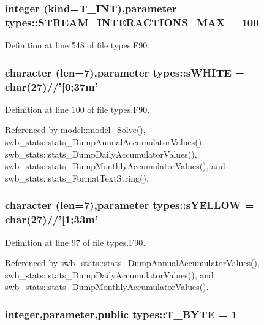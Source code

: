 \hypertarget{namespacetypes_a4ff333366786c6aa260d0b177b01c29a}{
\subsubsection[{STREAM\_\-INTERACTIONS\_\-MAX}]{\setlength{\rightskip}{0pt plus 5cm}integer (kind={\bf T\_\-INT}),parameter {\bf types::STREAM\_\-INTERACTIONS\_\-MAX} = 100}}
\label{namespacetypes_a4ff333366786c6aa260d0b177b01c29a}


Definition at line 548 of file types.F90.

\hypertarget{namespacetypes_a71a8a20288478902850fec078b982946}{
\subsubsection[{sWHITE}]{\setlength{\rightskip}{0pt plus 5cm}character (len=7),parameter {\bf types::sWHITE} = char(27)//'\mbox{[}0;37m'}}
\label{namespacetypes_a71a8a20288478902850fec078b982946}


Definition at line 100 of file types.F90.



Referenced by model::model\_\-Solve(), swb\_\-stats::stats\_\-DumpAnnualAccumulatorValues(), swb\_\-stats::stats\_\-DumpDailyAccumulatorValues(), swb\_\-stats::stats\_\-DumpMonthlyAccumulatorValues(), and swb\_\-stats::stats\_\-FormatTextString().

\hypertarget{namespacetypes_aea7cf70fa292d9310d8684a10a075b10}{
\subsubsection[{sYELLOW}]{\setlength{\rightskip}{0pt plus 5cm}character (len=7),parameter {\bf types::sYELLOW} = char(27)//'\mbox{[}1;33m'}}
\label{namespacetypes_aea7cf70fa292d9310d8684a10a075b10}


Definition at line 97 of file types.F90.



Referenced by swb\_\-stats::stats\_\-DumpAnnualAccumulatorValues(), swb\_\-stats::stats\_\-DumpDailyAccumulatorValues(), and swb\_\-stats::stats\_\-DumpMonthlyAccumulatorValues().

\hypertarget{namespacetypes_ac6380d8d9107c7fce9504b0b13552570}{
\subsubsection[{T\_\-BYTE}]{\setlength{\rightskip}{0pt plus 5cm}integer,parameter,public {\bf types::T\_\-BYTE} = 1}}
\label{namespacetypes_ac6380d8d9107c7fce9504b0b13552570}


